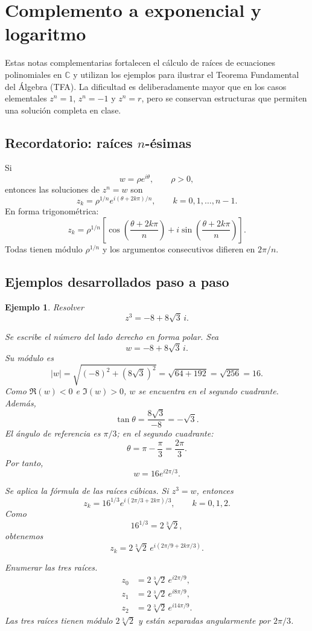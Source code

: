 \documentclass[12pt]{article}
\newtheorem{ejemplo}{Ejemplo}[section]
\newcommand{\C}{\mathbb{C}}
\begin{document}

\section{Complemento a exponencial y logaritmo}


Estas notas complementarias fortalecen el cálculo de raíces de ecuaciones
polinomiales en $\C$ y utilizan los ejemplos para ilustrar el Teorema
Fundamental del Álgebra (TFA). La dificultad es deliberadamente mayor que en
los casos elementales $z^n=1$, $z^n=-1$ y $z^n=r$, pero se conservan
estructuras que permiten una solución completa en clase.

\subsection*{Recordatorio: raíces $n$-ésimas}
Si
\[
w=\rho e^{i\theta},\qquad \rho>0,
\]
entonces las soluciones de $z^n=w$ son
\[
\boxed{z_k=\rho^{1/n}e^{i(\theta+2k\pi)/n}},
\qquad k=0,1,\ldots,n-1.
\]
En forma trigonométrica:
\[
z_k=\rho^{1/n}\left[
\cos\left(\frac{\theta+2k\pi}{n}\right)
+i\sin\left(\frac{\theta+2k\pi}{n}\right)\right].
\]
Todas tienen módulo $\rho^{1/n}$ y los argumentos consecutivos difieren en
$2\pi/n$.


\subsection*{Ejemplos desarrollados paso a paso}

\begin{ejemplo}
Resolver
\[
z^3=-8+8\sqrt3\,i.
\]

Se escribe el número del lado derecho en forma polar. Sea
\[
w=-8+8\sqrt3\,i.
\]
Su módulo es
\[
|w|=\sqrt{(-8)^2+(8\sqrt3)^2}
=\sqrt{64+192}
=\sqrt{256}=16.
\]
Como $\Re(w)<0$ e $\Im(w)>0$, $w$ se encuentra en el segundo cuadrante.
Además,
\[
\tan\theta=\frac{8\sqrt3}{-8}=-\sqrt3.
\]
El ángulo de referencia es $\pi/3$; en el segundo cuadrante:
\[
\theta=\pi-\frac{\pi}{3}=\frac{2\pi}{3}.
\]
Por tanto,
\[
w=16e^{i2\pi/3}.
\]

Se aplica la fórmula de las raíces cúbicas. Si $z^3=w$, entonces
\[
z_k=16^{1/3}
e^{i(2\pi/3+2k\pi)/3},
\qquad k=0,1,2.
\]
Como
\[
16^{1/3}=2\sqrt[3]{2},
\]
obtenemos
\[
z_k=2\sqrt[3]{2}\,
e^{i(2\pi/9+2k\pi/3)}.
\]

Enumerar las tres raíces.
\[
\boxed{
\begin{aligned}
z_0&=2\sqrt[3]{2}\,e^{i2\pi/9},\\
z_1&=2\sqrt[3]{2}\,e^{i8\pi/9},\\
z_2&=2\sqrt[3]{2}\,e^{i14\pi/9}.
\end{aligned}}
\]
Las tres raíces tienen módulo $2\sqrt[3]{2}$ y están separadas angularmente por
$2\pi/3$.
\end{ejemplo}
\end{document}
